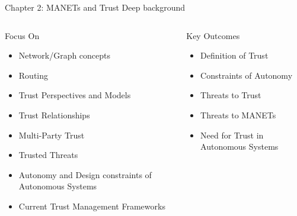 \documentclass[aspectratio=169]{beamer}
\begin{document}
\begin{frame}{Chapter 2: MANETs and Trust}
  Deep background
  
    \begin{columns}
    	\begin{column}{0.5\textwidth}
			\begin{block}{Focus On}
				\begin{itemize}
					\item Network/Graph concepts
					\item Routing
					\item Trust Perspectives and Models
					\item Trust Relationships
					\item Multi-Party Trust
					\item Trusted Threats
					\item Autonomy and Design constraints of Autonomous Systems
					\item Current Trust Management Frameworks
				\end{itemize}
			\end{block}
    	\end{column}
    	\begin{column}{0.5\textwidth}
    		\begin{exampleblock}{Key Outcomes}
    			\begin{itemize}
    				\item Definition of Trust
    				\item Constraints of Autonomy
    				\item Threats to Trust
    				\item Threats to MANETs
    				\item Need for Trust in Autonomous Systems

    			\end{itemize}
    		\end{exampleblock}
    	\end{column}
    \end{columns}
      
\end{frame}
\end{document}
